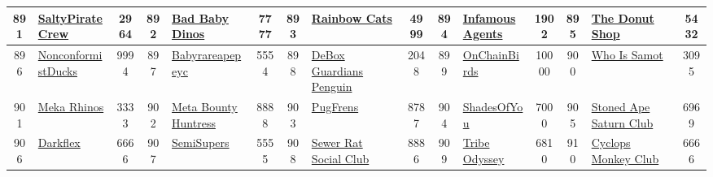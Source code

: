 \begin{table*}[]
{\begin{tabular}{|c|l|c|c|l|c|c|l|c|c|l|c|c|l|c|}
        891   & \href{https://www.saltypiratecrew.io/}{SaltyPirateCrew}                            & 2964              & 892   & \href{https://dinomart.io/}{Bad Baby Dinos}                                                       & 7777              & 893   & \href{http://rainbowcatsnft.com}{Rainbow Cats}                                    & 4999              & 894   & \href{https://linktr.ee/infamousltd}{InfamousAgents}                          & 1902              & 895   & \href{https://www.donutshop.io/}{The Donut Shop}                                          & 5432                                    \\ \hline
        896   & \href{https://nonconformistducks.com/}{NonconformistDucks}                         & 9994              & 897   & \href{https://opensea.io/collection/babyrareapepeyachtclub}{Babyrareapepeyc}                      & 5554              & 898   & \href{https://debox.pro}{DeBox Guardians Penguin}                                 & 2048              & 899   & \href{https://onchainbirds.com}{OnChainBirds}                                 & 10000             & 900   & \href{https://samot.club}{Who Is Samot}                                                   & 3095                                    \\ \hline
        901   & \href{https://mekarhinos.io}{Meka Rhinos}                                          & 3333              & 902   & \href{https://www.metabountyhuntress.io/}{Meta Bounty Huntress}                                   & 8888              & 903   & \href{https://opensea.io/collection/pugfrens}{PugFrens}                           & 8787              & 904   & \href{http://soy.xyz}{ShadesOfYou}                                            & 7000              & 905   & \href{https://www.stonedapez.club/}{Stoned Ape Saturn Club}                               & 6969                                    \\ \hline
        906   & \href{https://darkflex.io}{Darkflex}                                               & 6666              & 907   & \href{https://semisupers.com}{SemiSupers}                                                         & 5555              & 908   & \href{https://sewerratsocial.club}{Sewer Rat Social Club}                         & 8886              & 909   & \href{https://tribeodyssey.com/}{Tribe Odyssey}                               & 6810              & 910   & \href{http://cyclopsmonkeyclub.com}{Cyclops Monkey Club}                                  & 6666                                    \\ \hline

\end{tabular}}
\end{table*}
